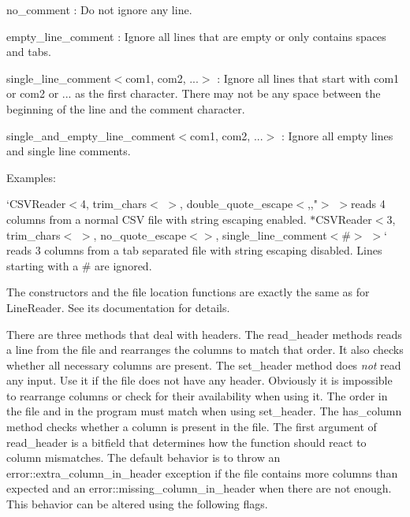 \begin{DoxyItemize}
\item {\ttfamily no\+\_\+comment} \+: Do not ignore any line.
\item {\ttfamily empty\+\_\+line\+\_\+comment} \+: Ignore all lines that are empty or only contains spaces and tabs.
\item {\ttfamily single\+\_\+line\+\_\+comment$<$com1, com2, ...$>$} \+: Ignore all lines that start with com1 or com2 or ... as the first character. There may not be any space between the beginning of the line and the comment character.
\item {\ttfamily single\+\_\+and\+\_\+empty\+\_\+line\+\_\+comment$<$com1, com2, ...$>$} \+: Ignore all empty lines and single line comments.
\end{DoxyItemize}

Examples\+:


\begin{DoxyItemize}
\item `\+C\+S\+V\+Reader$<$4, trim\+\_\+chars$<$\textquotesingle{} \textquotesingle{}$>$, double\+\_\+quote\+\_\+escape$<$\textquotesingle{},\textquotesingle{},\textquotesingle{}"\textquotesingle{}$>$ $>${\ttfamily reads 4 columns from a normal C\+SV file with string escaping enabled. $\ast$}C\+S\+V\+Reader$<$3, trim\+\_\+chars$<$\textquotesingle{} \textquotesingle{}$>$, no\+\_\+quote\+\_\+escape$<$\textquotesingle{}\textquotesingle{}$>$, single\+\_\+line\+\_\+comment$<$\textquotesingle{}\#\textquotesingle{}$>$ $>$` reads 3 columns from a tab separated file with string escaping disabled. Lines starting with a \# are ignored.
\end{DoxyItemize}

The constructors and the file location functions are exactly the same as for {\ttfamily Line\+Reader}. See its documentation for details.

There are three methods that deal with headers. The {\ttfamily read\+\_\+header} methods reads a line from the file and rearranges the columns to match that order. It also checks whether all necessary columns are present. The {\ttfamily set\+\_\+header} method does {\itshape not} read any input. Use it if the file does not have any header. Obviously it is impossible to rearrange columns or check for their availability when using it. The order in the file and in the program must match when using {\ttfamily set\+\_\+header}. The {\ttfamily has\+\_\+column} method checks whether a column is present in the file. The first argument of {\ttfamily read\+\_\+header} is a bitfield that determines how the function should react to column mismatches. The default behavior is to throw an {\ttfamily error\+::extra\+\_\+column\+\_\+in\+\_\+header} exception if the file contains more columns than expected and an {\ttfamily error\+::missing\+\_\+column\+\_\+in\+\_\+header} when there are not enough. This behavior can be altered using the following flags.


